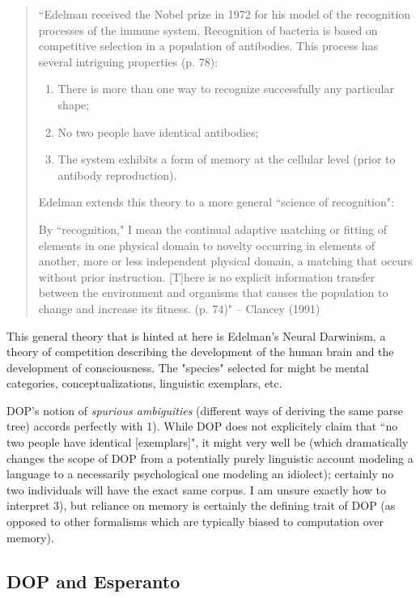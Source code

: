 \documentclass[10pt,a4paper]{article}
\begin{document}
\begin{quote}
	``Edelman received the Nobel prize in 1972 for his model of the
	recognition processes of the immune system. Recognition of bacteria is
	based on competitive selection in a population of antibodies. This
	process has several intriguing properties (p. 78): 
	
	\begin{enumerate} %
	\item There is more than one way to recognize successfully any particular shape;
	\item No two people have identical antibodies;
	\item The system exhibits a form of memory at the cellular level (prior to
	antibody reproduction).
	\end{enumerate}

	Edelman extends this theory to a more general ``science of recognition": 

	By ``recognition," I mean the continual adaptive matching or fitting of
	elements in one physical domain to novelty occurring in elements of
	another, more or less independent physical domain, a matching that
	occurs without prior instruction. [T]here is no explicit information
	transfer between the environment and organisms that causes the
	population to change and increase its fitness. (p. 74)" 
	-- Clancey (1991)
\end{quote}

This general theory that is hinted at here is Edelman's Neural Darwinism,
a theory of competition describing the development of the human brain and
the development of consciousness. The "species" selected for might be mental
categories, conceptualizations, linguistic exemplars, etc. 

DOP's notion of {\em spurious ambiguities} (different ways of deriving the same
parse tree) accords perfectly with 1).  While DOP does not explicitely claim
that ``no two people have identical [exemplars]", it might very well be (which
dramatically changes the scope of DOP from a potentially purely linguistic
account modeling a language to a necessarily psychological one modeling an
idiolect); certainly no two individuals will have the exact same corpus. I am
unsure exactly how to interpret 3), but reliance on memory is certainly the
defining trait of DOP (as opposed to other formalisms which are typically
biased to computation over memory).

\subsection{DOP and Esperanto}
\end{document}
